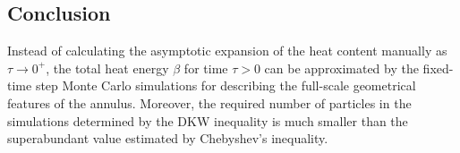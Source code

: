 
\subsection{Conclusion}


Instead of calculating the asymptotic expansion of the heat content
manually as $\tau \rightarrow 0^+$, the total heat energy $\beta$
\cite{gilkey1994heat} for time $\tau > 0$ can be approximated by the
fixed-time step Monte Carlo simulations for describing the full-scale
geometrical features of the annulus. Moreover, the required
number of particles in the simulations determined by the DKW
inequality is much smaller than the superabundant value estimated by
Chebyshev’s inequality.
